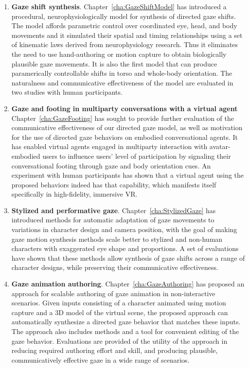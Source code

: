 \begin{enumerate}
\item \textbf{Gaze shift synthesis}. Chapter~\ref{cha:GazeShiftModel} has introduced a procedural, neurophysiologically model for synthesis of directed gaze shifts. The model affords parametric control over coordinated eye, head, and body movements and it simulated their spatial and timing relationships using a set of kinematic laws derived from neurophysiology research. Thus it eliminates the need to use hand-authoring or motion capture to obtain biologically plausible gaze movements. It is also the first model that can produce paramerically controllable shifts in torso and whole-body orientation. The naturalness and communicative effectiveness of the model are evaluated in two studies with human participants.
\item \textbf{Gaze and footing in multiparty conversations with a virtual agent} Chapter~\ref{cha:GazeFooting} has sought to provide further evaluation of the communicative effectiveness of our directed gaze model, as well as motivation for the use of directed gaze behaviors on embodied conversational agents. It has enabled virtual agents engaged in multiparty interaction with avatar-embodied users to influence users' level of participation by signaling their conversational footing through gaze and body orientation cues. An experiment with human participants has shown that a virtual agent using the proposed behaviors indeed has that capability, which manifests itself specifically in high-fidelity, immersive VR.
\item \textbf{Stylized and performative gaze}. Chapter~\ref{cha:StylizedGaze} has introduced methods for automatic adaptation of gaze movements to variations in character design and camera position, with the goal of making gaze motion synthesis methods scale better to stylized and non-human characters with exaggerated eye shape and proportions. A set of evaluations have shown that these methods allow synthesis of gaze shifts across a range of character designs, while preserving their communicative effectiveness.
\item \textbf{Gaze animation authoring}. Chapter~\ref{cha:GazeAuthoring} has proposed an approach for scalable authoring of gaze animation in non-interactive scenarios. Given inputs consisting of a character animated using motion capture and a 3D model of the virtual scene, the proposed approach can automatically synthesize a directed gaze behavior that matches these inputs. The approach also includes methods and a tool for convenient editing of the gaze behavior. Evaluations are provided of the utility of the approach in reducing required authoring effort and skill, and producing plausible, communicatively effective gaze in a wide range of scenarios.
\end{enumerate}

